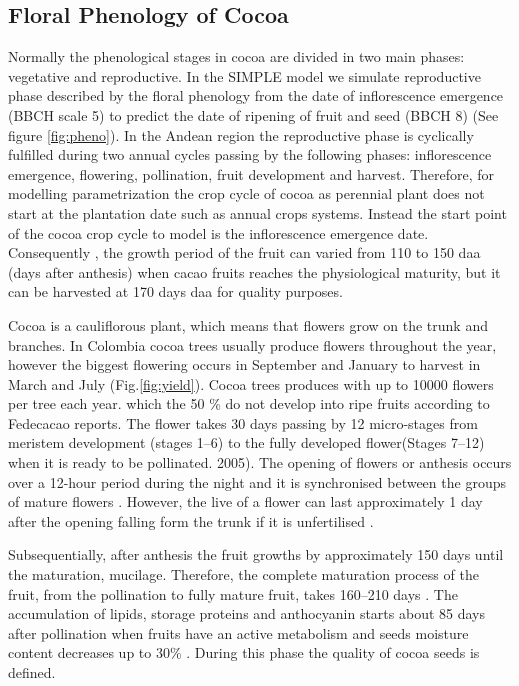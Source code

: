 \documentclass[gene,journal,article,submit,moreauthors,pdftex]{Definitions/mdpi}
\begin{document}
\subsection{Floral Phenology of Cocoa }
Normally the phenological stages in cocoa are  divided in two main phases: vegetative and reproductive. In the SIMPLE model we simulate reproductive phase described by the floral phenology from the date of inflorescence emergence (BBCH scale 5) to predict the date of ripening of fruit and seed (BBCH 8) \citep{Niemenak2010} (See figure \ref{fig:pheno}). In the Andean region the reproductive phase is cyclically fulfilled during two annual cycles passing by the following phases: inflorescence emergence, flowering, pollination, fruit development and harvest. Therefore, for modelling parametrization the crop cycle of cocoa as perennial plant does not start at the plantation date such as annual crops systems. Instead  the start point of the cocoa crop cycle to model is the inflorescence emergence date. Consequently , the growth period of the fruit can varied from  110 to 150  daa (days after anthesis) \citep{lopez2018} when cacao fruits reaches the physiological maturity, but it can be harvested at 170 days daa \citep{Niemenak2010} for quality purposes.

Cocoa is a cauliflorous plant, which means that flowers grow on the trunk and branches. In Colombia cocoa trees usually produce flowers throughout the year, however the biggest flowering occurs in September and January to harvest in March and July (Fig.\ref{fig:yield}). Cocoa trees produces with up to 10000 flowers per tree each year. which the 50 \%  do not develop into ripe fruits according to Fedecacao reports. The flower takes 30 days passing by 12 micro-stages from meristem development (stages 1–6) to the fully developed flower(Stages 7–12) \citep{swanson2005} when it is ready to be pollinated. 2005). The opening of flowers or anthesis  occurs over a 12-hour period during the night and it is synchronised between the groups of mature flowers \citep{Niemenak2010}. However, the live of a flower can last approximately 1 day after the opening falling form the trunk if it is unfertilised \citep{cheesman1927, Niemenak2010}.

Subsequentially, after anthesis the fruit growths by approximately 150 days until the maturation, mucilage. Therefore, the complete maturation process of the fruit, from the pollination to fully mature fruit, takes 160–210 days \cite{berry1994}. The accumulation of lipids, storage proteins and anthocyanin starts about 85 days after pollination when fruits have an active metabolism and seeds   moisture content decreases up to 30\% \cite{Lehrian1980, Niemenak2010}. During this phase the quality of cocoa seeds is defined.\\
 
\end{document}
